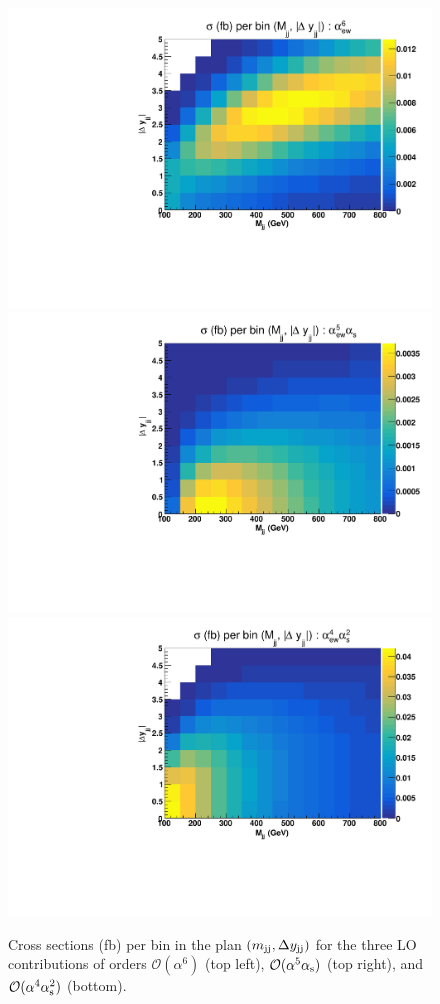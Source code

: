 \begin{figure}[ht]
\centering
\includegraphics[scale=0.395]{figures/scanfigures/scan_ew6.pdf}
\includegraphics[scale=0.395]{figures/scanfigures/scan_ew5qcd1.pdf}
\includegraphics[scale=0.395]{figures/scanfigures/scan_ew4qcd2.pdf}
\caption{Cross sections (fb) per bin in the plan $\left(m_{\text{j}\text{j}}, \Delta y_{\text{j}\text{j}}\right)$ for the three LO contributions of orders $\mathcal{O}(\alpha^6)$ (top left), $\mathcal{O}(\alpha^5\alpha_\text{s})$ (top right), and $\mathcal{O}(\alpha^4 \alpha_\text{s}^2)$ (bottom).}
\label{fig:mjjdyjj_2d_LO}
\end{figure}
